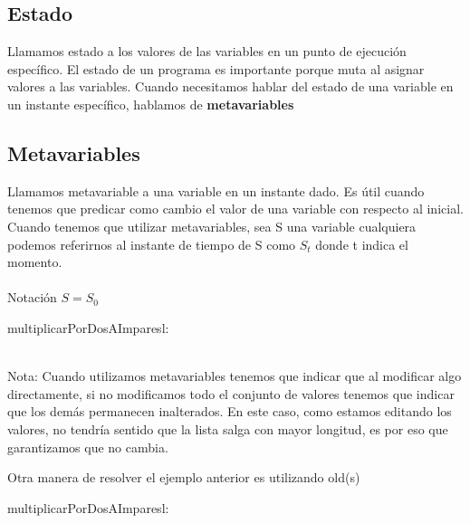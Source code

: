 \documentclass[10pt,a4paper]{article}
\begin{document}
\subsection*{Estado}
Llamamos estado a los valores de las variables en un punto de ejecución específico. El estado de un programa es importante porque muta al asignar valores a las variables.
Cuando necesitamos hablar del estado de una variable en un instante específico, hablamos de \textbf{metavariables} \\ 

\subsection*{Metavariables}
Llamamos metavariable a una variable en un instante dado. Es útil cuando tenemos que predicar como cambio el valor de una variable con respecto al inicial. \\
Cuando tenemos que utilizar metavariables, sea S una variable cualquiera podemos referirnos al instante de tiempo de S como \(S_{t}\) donde t indica el momento. \\ \\ 
Notación \(S = S_{0}\)

\begin{proc}{multiplicarPorDosAImpares}{\Inout l: \TLista{\ent}}{}
\end{proc}
\leavevmode
\\
Nota: Cuando utilizamos metavariables tenemos que indicar que al modificar algo directamente, si no modificamos todo el conjunto de valores tenemos que indicar que los demás permanecen inalterados. En este caso, como estamos editando los valores, no tendría sentido que la lista salga con mayor longitud, es por eso que garantizamos que no cambia. 

Otra manera de resolver el ejemplo anterior es utilizando old(s)
\begin{proc}{multiplicarPorDosAImpares}{\Inout l: \TLista{\ent}}{}
\end{proc}
\leavevmode
\\
\end{document}

